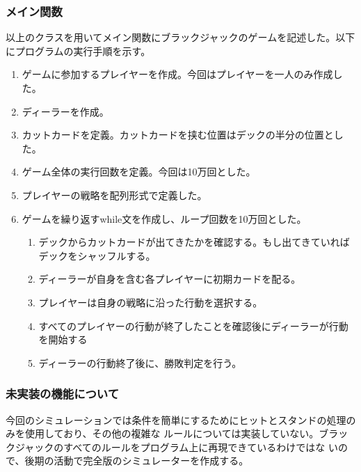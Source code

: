 \subsubsection{メイン関数}
以上のクラスを用いてメイン関数にブラックジャックのゲームを記述した。以下にプログラムの実行手順を示す。
\begin{enumerate}
    \item ゲームに参加するプレイヤーを作成。今回はプレイヤーを一人のみ作成した。
    \item ディーラーを作成。
    \item カットカードを定義。カットカードを挟む位置はデックの半分の位置とした。
    \item ゲーム全体の実行回数を定義。今回は10万回とした。
    \item プレイヤーの戦略を配列形式で定義した。
    \item ゲームを繰り返すwhile文を作成し、ループ回数を10万回とした。
    \begin{enumerate}
        \item デックからカットカードが出てきたかを確認する。もし出てきていればデックをシャッフルする。
	  \item ディーラーが自身を含む各プレイヤーに初期カードを配る。
	  \item プレイヤーは自身の戦略に沿った行動を選択する。
	  \item すべてのプレイヤーの行動が終了したことを確認後にディーラーが行動を開始する
	  \item ディーラーの行動終了後に、勝敗判定を行う。
    \end{enumerate}
\end{enumerate}


\subsubsection{未実装の機能について}
今回のシミュレーションでは条件を簡単にするためにヒットとスタンドの処理のみを使用しており、その他の複雑な
ルールについては実装していない。ブラックジャックのすべてのルールをプログラム上に再現できているわけではな
いので、後期の活動で完全版のシミュレーターを作成する。
